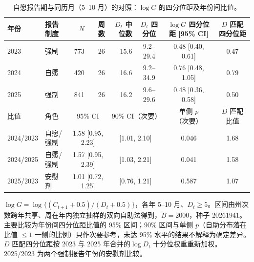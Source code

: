 \begin{table}[htbp]
\centering
\footnotesize
\setlength{\tabcolsep}{3pt}
\caption{自愿报告期与同历月（5--10 月）的对照：$\log G$ 的四分位距及年份间比值。}
\label{tab:s4}
\begin{tabular}{llrrrccc}
\toprule
年份 & 报告制度 & $N$ & 周数 & $D_t$ 中位数 & $D_t$ 四分位 & $\log G$ 四分位距 [95\% CI] & $D$ 匹配四分位距 \\
\midrule
2023 & 强制 & 773 & 26 & 15.6 & 9.2--29.4 & 0.48 [0.40, 0.61] & 0.47 \\
2024 & 自愿 & 420 & 26 & 16.6 & 9.2--34.9 & 0.76 [0.48, 1.05] & 0.79 \\
2025 & 强制 & 841 & 26 & 16.2 & 9.6--29.6 & 0.48 [0.36, 0.58] & 0.50 \\
\midrule
比值 & 角色 & \multicolumn{2}{c}{95\% CI} & \multicolumn{2}{c}{90\% CI（次要）} & 单侧 $p$（次要） & $D$ 匹配比值 \\
\midrule
2024/2023 & 自愿/强制 & \multicolumn{2}{c}{1.58 [0.95, 2.23]} & \multicolumn{2}{c}{[1.01, 2.10]} & 0.046 & 1.68 \\
2024/2025 & 自愿/强制 & \multicolumn{2}{c}{1.57 [0.95, 2.39]} & \multicolumn{2}{c}{[1.03, 2.21]} & 0.041 & 1.58 \\
2025/2023 & 安慰剂 & \multicolumn{2}{c}{1.01 [0.72, 1.25]} & \multicolumn{2}{c}{[0.76, 1.21]} & 0.587 & 1.07 \\
\bottomrule
\end{tabular}
\par\smallskip
\begin{minipage}{0.95\linewidth}\scriptsize $\log G=\log\{(C_{t+1}+0.5)/(D_t+0.5)\}$，各年 5--10 月、$D_t\ge5$。区间由州次数跨年共享、周在年内独立抽样的双向自助法得到，$B=2000$，种子 20261941。主要比较为年份间四分位距比值的 95\% 区间；90\% 区间与单侧 $p$（自助分布落在比值 $\le1$ 一侧的比例）只作次要参考，未达 95\% 水平的结果不解释为确定差异。$D$ 匹配四分位距按 2023 与 2025 年合并的$\log D_t$ 十分位权重重新加权。2025/2023 为两个强制报告年份的安慰剂比较。\end{minipage}
\end{table}
